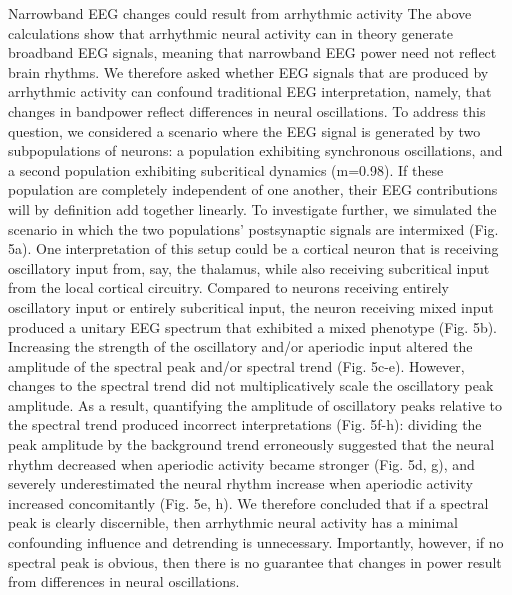 Narrowband EEG changes could result from arrhythmic activity
The above calculations show that arrhythmic neural activity can in theory generate broadband EEG signals, meaning that narrowband EEG power need not reflect brain rhythms. We therefore asked whether EEG signals that are produced by arrhythmic activity can confound traditional EEG interpretation, namely, that changes in bandpower reflect differences in neural oscillations. To address this question, we considered a scenario where the EEG signal is generated by two subpopulations of neurons: a population exhibiting synchronous oscillations, and a second population exhibiting subcritical dynamics (m=0.98). If these population are completely independent of one another, their EEG contributions will by definition add together linearly. To investigate further, we simulated the scenario in which the two populations’ postsynaptic signals are intermixed (Fig. 5a). One interpretation of this setup could be a cortical neuron that is receiving oscillatory input from, say, the thalamus, while also receiving subcritical input from the local cortical circuitry. Compared to neurons receiving entirely oscillatory input or entirely subcritical input, the neuron receiving mixed input produced a unitary EEG spectrum that exhibited a mixed phenotype (Fig. 5b). Increasing the strength of the oscillatory and/or aperiodic input altered the amplitude of the spectral peak and/or spectral trend (Fig. 5c-e). However, changes to the spectral trend did not multiplicatively scale the oscillatory peak amplitude. As a result, quantifying the amplitude of oscillatory peaks relative to the spectral trend produced incorrect interpretations (Fig. 5f-h): dividing the peak amplitude by the background trend erroneously suggested that the neural rhythm decreased when aperiodic activity became stronger (Fig. 5d, g), and severely underestimated the neural rhythm increase when aperiodic activity increased concomitantly (Fig. 5e, h). We therefore concluded that if a spectral peak is clearly discernible, then arrhythmic neural activity has a minimal confounding influence and detrending is unnecessary. Importantly, however, if no spectral peak is obvious, then there is no guarantee that changes in power result from differences in neural oscillations.

